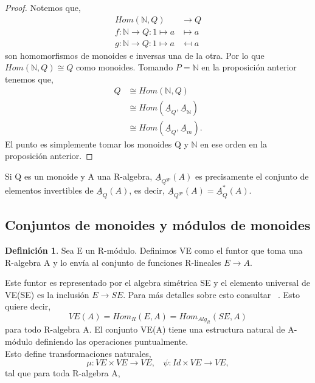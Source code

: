 \documentclass[12pt,spanish]{amsart}
\newcommand{\bb}[1]{\mathbb{#1}}
\theoremstyle{definition}
\newtheorem{Def}[Theorem]{Definición}
\theoremstyle{remark}
\begin{document}
\begin{proof}
Notemos que,
\begin{equation*}
\begin{split}
Hom(\bb{N},Q) &\to Q \\
f:\bb{N} \to Q:1 \mapsto a &\mapsto a \\
g:\bb{N} \to Q:1 \mapsto a &\mapsfrom a
\end{split}
\end{equation*}
son homomorfismos de monoides e inversas una de la otra. Por lo que $Hom(\bb{N},Q) \cong Q$ como monoides. Tomando $P=\bb{N}$ en la proposición anterior tenemos que,
\begin{equation*}
\begin{split}
Q &\cong Hom(\bb{N},Q) \\
&\cong Hom(\underline{A}_{Q},\underline{A}_{\bb{N}}) \\
&\cong Hom(\underline{A}_{Q},\underline{A}_{m}).
\end{split}
\end{equation*}
El punto es simplemente tomar los monoides Q y $\bb{N}$ en ese orden en la proposición anterior. 
\end{proof}

Si Q es un monoide y A una R-algebra, $\underline{A}_{Q^{gp}}(A)$ es precisamente el conjunto de elementos invertibles de $\underline{A}_{Q}(A)$, es decir, $\underline{A}_{Q^{gp}}(A)=\underline{A}_{Q}^{\ast}(A)$. 










\subsection{Conjuntos de monoides y módulos de monoides}
\begin{Def}
Sea E un R-módulo. Definimos VE como el funtor que toma una R-algebra A y lo envía al conjunto de funciones R-lineales $E \to A$. 
\end{Def}
Este funtor es representado por el algebra simétrica SE y el elemento universal de VE(SE) es la inclusión $E \to SE$. Para más detalles sobre esto consultar ~\cite{dieudonne1971elements}. Esto quiere decir,
$$VE(A)=Hom_{R}(E,A)=Hom_{Alg_{R}}(SE,A)$$
para todo R-algebra A. El conjunto VE(A) tiene una estructura natural de A-módulo definiendo las operaciones puntualmente. \\
Esto define transformaciones naturales,
$$\mu:VE\times VE \to VE,~~~~ \psi:Id\times VE \to VE,$$
tal que para toda R-algebra A,
\end{document}
